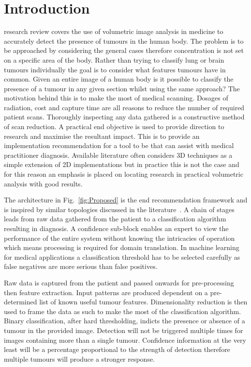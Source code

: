 \documentclass[journal]{IEEEtran}
\begin{document}
\section{Introduction}
 research review covers the use of volumetric image analysis in medicine to accurately detect the presence of tumours in the human body. 
The problem is to be approached by considering the general cases therefore concentration is not set on a specific area of the body.
Rather than trying to classify lung or brain tumours individually the goal is to consider what features tumours have in common.
Given an entire image of a human body is it possible to classify the presence of a tumour in any given section whilst using the same approach?
The motivation behind this is to make the most of medical scanning.
Dosages of radiation, cost and capture time are all reasons to reduce the number of required patient scans.
Thoroughly inspecting any data gathered is a constructive method of scan reduction.
A practical end objective is used to provide direction to research and maximise the resultant impact.
This is to provide an implementation recommendation for a tool to be that can assist with medical practitioner diagnosis.  
Available literature often considers 3D techniques as a simple extension of 2D implementations but in practice this is not the case and for this reason an emphasis is placed on locating research in practical volumetric analysis with good results.   


The architecture in Fig.~\ref{fig:Proposed} is the end recommendation framework and is inspired by similar topologies discussed in the literature~\cite{ahmed2011efficacy,kumar2011classification,hau07feat,sachdeva2011multiclass,kostis03three}.
A chain of stages leads from raw data gathered from the patient to a classification algorithm resulting in diagnosis.
A confidence sub-block enables an expert to view the performance of the entire system without knowing the intricacies of operation which means processing is required for domain translation.
In machine learning for medical applications a classification threshold has to be selected carefully as false negatives are more serious than false positives.

Raw data is captured from the patient and passed onwards for pre-processing then feature extraction.
Input patterns are produced dependent on a pre-determined list of known useful tumour features. 
Dimensionality reduction is then used to frame the data as such to make the most of the classification algorithm.
Binary classification, after hard thresholding, indicts the presence or absence of a tumour in the provided image.
Detection will not be triggered multiple times for images containing more than a single tumour. 
Confidence information at the very least will be a percentage proportional to the strength of detection therefore multiple tumours will produce a stronger response. 
\end{document}
